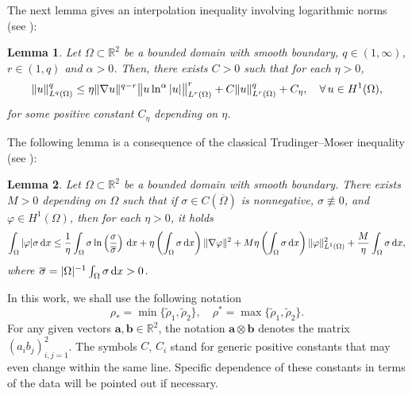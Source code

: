 \documentclass[11pt,reqno]{amsart}
\newtheorem{lemma}{\textbf{Lemma}}[section]
\def\d{{\rm d}}
\newcommand{\R}{\ensuremath{\mathbb{R}}}
\begin{document}
The next lemma gives an interpolation inequality involving logarithmic norms (see \cite[Lemma A.5]{TW2014}):
%
\begin{lemma}
\label{GN-ln}
Let $\Omega\subset \mathbb{R}^2$ be a bounded domain with smooth boundary, $q \in (1,\infty)$,  $r\in (1,q)$  and $\alpha>0$. Then, there exists $C>0$ such that for each $\eta>0$,
%
\begin{equation}
\| u\|_{L^q(\Omega)}^q \leq \eta \| \nabla u\|^{q-r} \big\| u \ln^\alpha |u|\big\|_{L^r(\Omega)}^r
+ C \| u\|_{L^r(\Omega)}^q + C_\eta, \quad \forall \, u \in H^1(\Omega),
\notag
\end{equation}
%
for some positive constant $C_\eta$ depending on $\eta$.
\end{lemma}
%
The following lemma is a consequence of the classical Trudinger--Moser inequality (see \cite[Lemma 2.2]{W2020}):
%
\begin{lemma}
\label{TM-var}
Let $\Omega\subset \mathbb{R}^2$ be a bounded domain with smooth boundary. There exists $M>0$ depending on $\Omega$ such that if $\sigma\in C(\overline{\Omega})$ is nonnegative, $\sigma \not\equiv 0$, and $\varphi\in H^1(\Omega)$, then for each $\eta >0$, it holds
%
\begin{align}
\int_\Omega|\varphi|\sigma\,\mathrm{d}x\leq \frac{1}{\eta}\int_\Omega \sigma\ln\left(\frac{\sigma}{\overline{\sigma}}\right)\,\d x
+ \eta \left(\int_\Omega\sigma\,\d x\right)\|\nabla \varphi\|^2
+ M\eta \left(\int_\Omega\sigma\,\d x\right) \|\varphi\|_{L^1(\Omega)}^2 + \frac{M}{\eta}\int_\Omega \sigma\,\d x,
\notag
\end{align}
%
where $\overline{\sigma}=|\Omega|^{-1}\int_\Omega \sigma\,\d x>0$.
\end{lemma}

In this work, we shall use the following notation
$$
\rho_\ast=\min \lbrace \widetilde{\rho}_1,\widetilde{\rho}_2\rbrace,
\quad \rho^\ast=\max \lbrace \widetilde{\rho}_1,\widetilde{\rho}_2\rbrace.
$$
For any given vectors $\bm{a}, \bm{b}\in \R^2$, the notation $\bm{a}\otimes\bm{b}$ denotes the matrix $(a_i b_j)_{i,j=1}^2$. The symbols $C$, $C_i$ stand for generic positive constants that may even change within the same line. Specific dependence of these constants in terms of the data will be pointed out if necessary.


\end{document}
